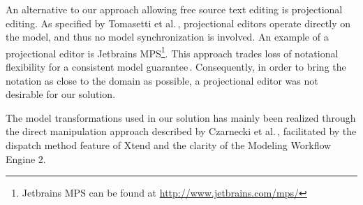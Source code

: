 An alternative to our approach allowing free source text editing is projectional editing. As specified by Tomasetti et al.\,\cite{tomasetti11}, projectional editors operate directly on the model, and thus no model synchronization is involved. An example of a projectional editor is Jetbrains MPS\footnote{Jetbrains MPS can be found at \url{http://www.jetbrains.com/mps/}}. This approach trades loss of notational flexibility for a consistent model guarantee\,\cite{conf/models/Voelter10}. Consequently, in order to bring the notation as close to the domain as possible, a projectional editor was not desirable for our solution.

The model transformations used in our solution has mainly been realized through the direct manipulation approach described by Czarnecki et al.\,\cite{czarnecki06}, facilitated by the dispatch method feature of Xtend and the clarity of the Modeling Workflow Engine 2.








